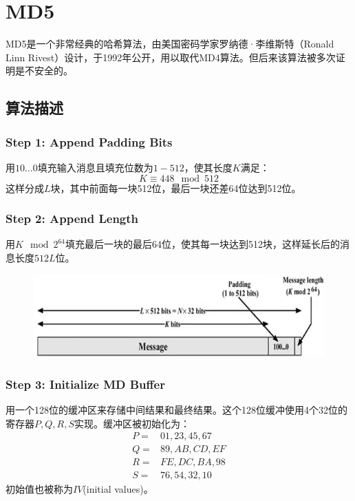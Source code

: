 \documentclass[UTF8, a4paper, 11pt]{article}
\begin{document}
\section{MD5}
MD5是一个非常经典的哈希算法，由美国密码学家罗纳德·李维斯特（Ronald Linn Rivest）设计，于1992年公开，用以取代MD4算法。但后来该算法被多次证明是不安全的。
\subsection{算法描述}
\subsubsection{Step 1: Append Padding Bits}
用$10\dots0$填充输入消息且填充位数为$1-512$，使其长度$K$满足：
$$K\equiv448\mod{512}$$
这样分成$L$块，其中前面每一块512位，最后一块还差64位达到512位。
\subsubsection{Step 2: Append Length}
用$K\mod{2^{64}}$填充最后一块的最后64位，使其每一块达到512块，这样延长后的消息长度$512L$位。
\begin{figure}[H]
    \centering
    \includegraphics[width = 0.8 \textwidth]{padding.png}
\end{figure}
\subsubsection{Step 3: Initialize MD Buffer}
用一个128位的缓冲区来存储中间结果和最终结果。这个128位缓冲使用4个32位的寄存器$P,Q,R,S$实现。缓冲区被初始化为：
$$
    \begin{aligned}
        P= & 01,23,45,67 \\
        Q= & 89,AB,CD,EF \\
        R= & FE,DC,BA,98 \\
        S= & 76,54,32,10
    \end{aligned}
$$
初始值也被称为$IV$(initial values)。
\end{document}
